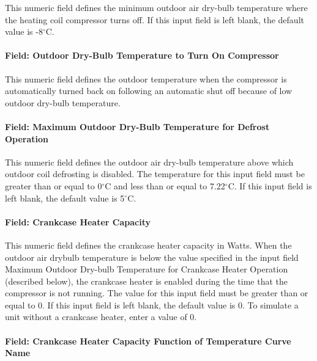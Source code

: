 This numeric field defines the minimum outdoor air dry-bulb temperature where the heating coil compressor turns off. If this input field is left blank, the default value is -8$^\circ$C.

\paragraph{Field: Outdoor Dry-Bulb Temperature to Turn On Compressor}\label{field-outdoor-dry-bulb-temperature-to-turn-on-compressor-1}

This numeric field defines the outdoor temperature when the compressor is automatically turned back on following an automatic shut off because of low outdoor dry-bulb temperature.

\paragraph{Field: Maximum Outdoor Dry-Bulb Temperature for Defrost Operation}\label{field-maximum-outdoor-dry-bulb-temperature-for-defrost-operation-2}

This numeric field defines the outdoor air dry-bulb temperature above which outdoor coil defrosting is disabled. The temperature for this input field must be greater than or equal to 0$^\circ$C and less than or equal to 7.22$^\circ$C. If this input field is left blank, the default value is 5$^\circ$C.

\paragraph{Field: Crankcase Heater Capacity}\label{field-crankcase-heater-capacity-6}

This numeric field defines the crankcase heater capacity in Watts. When the outdoor air drybulb temperature is below the value specified in the input field Maximum Outdoor Dry-bulb Temperature for Crankcase Heater Operation (described below), the crankcase heater is enabled during the time that the compressor is not running. The value for this input field must be greater than or equal to 0. If this input field is left blank, the default value is 0. To simulate a unit without a crankcase heater, enter a value of 0.

\paragraph{Field: Crankcase Heater Capacity Function of Temperature Curve Name}

